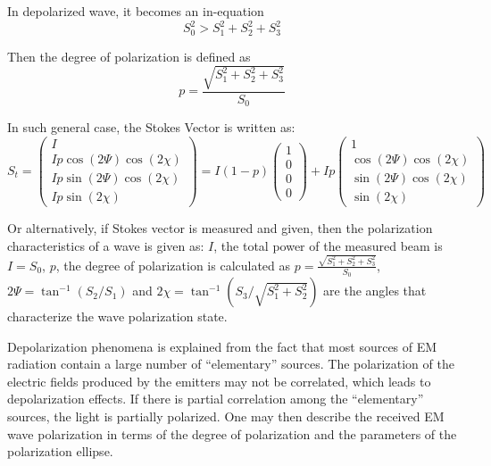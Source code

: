 In depolarized wave, it becomes an in-equation
\begin{equation}
S_0^2 > S_1^2 + S_2^2 + S_3^2
\end{equation}

Then the degree of polarization is defined as
\begin{equation}
p = \frac{\sqrt{ S_1^2 + S_2^2 + S_3^2 }}{S_0}
\end{equation}

In such general case, the Stokes Vector is written as:
\begin{equation}
S_t = 
\left(
\begin{array}{c}
 I \\
 I p \cos(2\Psi) \cos(2\chi) \\
 I p \sin(2\Psi) \cos(2\chi) \\
 I p \sin(2\chi)
\end{array}
\right)
 = I (1 - p)
\left(
\begin{array}{c}
 1 \\
 0 \\
 0 \\
 0
\end{array}
\right) 
+ I p
\left(
\begin{array}{c}
 1\\
 \cos(2\Psi) \cos(2\chi) \\
 \sin(2\Psi) \cos(2\chi) \\
 \sin(2\chi)
\end{array}
\right)
\end{equation}

Or alternatively, if Stokes vector is measured and given, then the polarization characteristics of a wave is given as:
$I$, the total power of the measured beam is $I=S_0$,
$p$, the degree of polarization is calculated as $p = \frac{\sqrt{ S_1^2 + S_2^2 + S_3^2 }}{S_0}$,
$2\Psi = \tan^{-1} (S_2/S_1) $ and $2 \chi = \tan^{-1} (S_3 / \sqrt{S_1^2 + S_2^2})$ are the angles that characterize the wave polarization state.

Depolarization phenomena is explained from the fact that most sources of EM radiation contain a large number of ``elementary'' sources.
The polarization of the electric fields produced by the emitters may not be correlated, which leads to depolarization effects.
If there is partial correlation among the ``elementary'' sources, the light is partially polarized. 
One may then describe the received EM wave polarization in terms of the degree of polarization and the parameters of the polarization ellipse.

